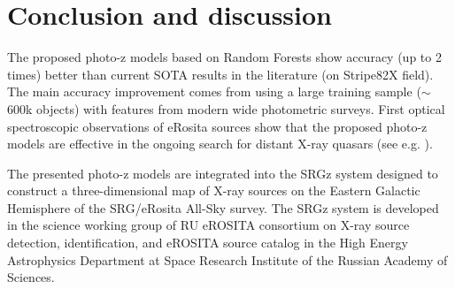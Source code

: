 \documentclass[fleqn,usenatbib]{mnras}
\begin{document}
\section{Conclusion and discussion}\label{sec:conclusion}



The proposed photo-z models based on Random Forests show accuracy (up to 2 times) better than current SOTA results in the literature (on Stripe82X field). The main accuracy improvement comes from using a large training sample ($\sim$600k objects) with features from modern wide photometric surveys. First optical spectroscopic observations of eRosita sources show that the proposed photo-z models are effective in the ongoing search for distant X-ray quasars (see e.g. \citep{2020MNRAS.497.1842M,2020AstL...46..149K,2020AstL...46..429D}).

The presented photo-z models are integrated into the SRGz system designed to construct a three-dimensional map of X-ray sources on the Eastern Galactic Hemisphere of the SRG/eRosita All-Sky survey. The SRGz system is developed in the science working group of RU eROSITA consortium on X-ray source detection, identification, and eROSITA source catalog in the High Energy Astrophysics Department at Space Research Institute of the Russian Academy of Sciences.

\end{document}
